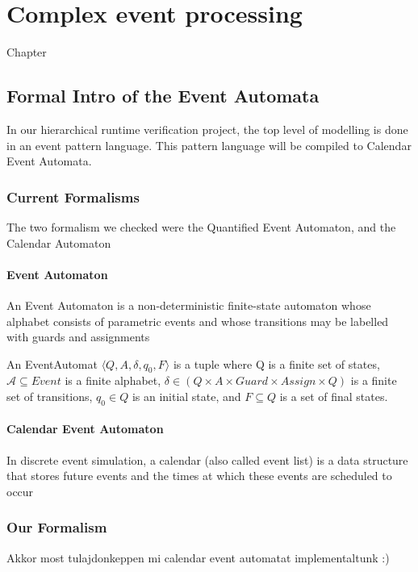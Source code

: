 \chapter{Complex event processing}
\label{chap:cep}
Chapter
\section{Formal Intro of the Event Automata}
	In our hierarchical runtime verification project, the top level of modelling is done in an event pattern language.
	This pattern language will be compiled to Calendar Event Automata.
	\subsection{Current Formalisms}
		The two formalism we checked were the Quantified Event Automaton, and the Calendar Automaton
		\subsubsection{Event Automaton}
			An Event Automaton is a non-deterministic finite-state automaton whose alphabet consists
			of parametric events and whose transitions may be labelled with guards and assignments
			
			\begin{dfn}
			An EventAutomat 
			$\langle Q,A,\delta, q_0, F \rangle$ is a tuple where Q is a finite set of states, 
			$\mathcal{A} \subseteq Event$ is a finite alphabet, 
			$\delta \in (Q \times A \times Guard \times Assign \times Q)$ is a finite set of transitions, 
			$q_0 \in Q$ is an initial state, and 
			$F \subseteq Q$ is a set of final states.
			\end{dfn}
			
		\subsubsection{Calendar Event Automaton}
			In discrete event simulation, a calendar (also called event list) is a data structure that
			stores future events and the times at which these events are scheduled to occur
			
	\subsection{Our Formalism}
		Akkor most tulajdonkeppen mi calendar event automatat implementaltunk :) 
